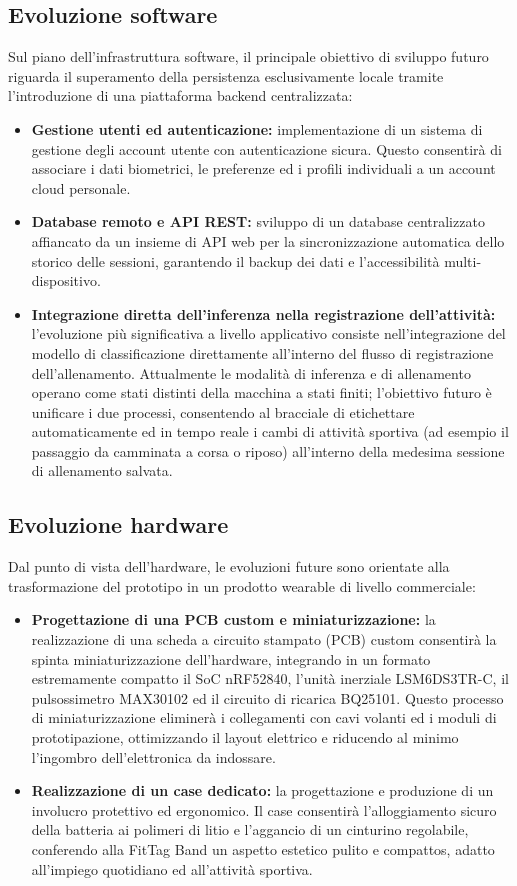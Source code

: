 \subsection{Evoluzione software}
Sul piano dell'infrastruttura software, il principale obiettivo di sviluppo futuro riguarda il superamento della persistenza esclusivamente locale tramite l'introduzione di una piattaforma backend centralizzata:
\begin{itemize}
    \item \textbf{Gestione utenti ed autenticazione:} implementazione di un sistema di gestione degli account utente con autenticazione sicura. Questo consentirà di associare i dati biometrici, le preferenze ed i profili individuali a un account cloud personale.
    \item \textbf{Database remoto e API REST:} sviluppo di un database centralizzato affiancato da un insieme di API web per la sincronizzazione automatica dello storico delle sessioni, garantendo il backup dei dati e l'accessibilità multi-dispositivo.
    \item \textbf{Integrazione diretta dell'inferenza nella registrazione dell'attività:} l'evoluzione più significativa a livello applicativo consiste nell'integrazione del modello di classificazione direttamente all'interno del flusso di registrazione dell'allenamento. Attualmente le modalità di inferenza e di allenamento operano come stati distinti della macchina a stati finiti; l'obiettivo futuro è unificare i due processi, consentendo al bracciale di etichettare automaticamente ed in tempo reale i cambi di attività sportiva (ad esempio il passaggio da camminata a corsa o riposo) all'interno della medesima sessione di allenamento salvata.
\end{itemize}

\subsection{Evoluzione hardware}
Dal punto di vista dell'hardware, le evoluzioni future sono orientate alla trasformazione del prototipo in un prodotto wearable di livello commerciale:
\begin{itemize}
    \item \textbf{Progettazione di una PCB custom e miniaturizzazione:} la realizzazione di una scheda a circuito stampato (PCB) custom consentirà la spinta miniaturizzazione dell'hardware, integrando in un formato estremamente compatto il SoC nRF52840, l'unità inerziale LSM6DS3TR-C, il pulsossimetro MAX30102 ed il circuito di ricarica BQ25101. Questo processo di miniaturizzazione eliminerà i collegamenti con cavi volanti ed i moduli di prototipazione, ottimizzando il layout elettrico e riducendo al minimo l'ingombro dell'elettronica da indossare.
    \item \textbf{Realizzazione di un case dedicato:} la progettazione e produzione di un involucro protettivo ed ergonomico. Il case consentirà l'alloggiamento sicuro della batteria ai polimeri di litio e l'aggancio di un cinturino regolabile, conferendo alla FitTag Band un aspetto estetico pulito e compattos, adatto all'impiego quotidiano ed all'attività sportiva.
\end{itemize}
